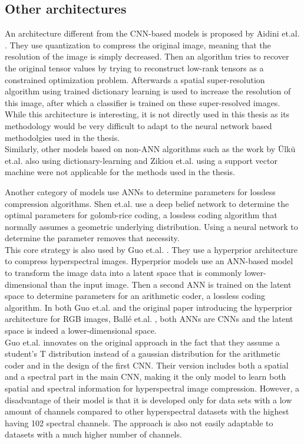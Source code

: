 \subsection{Other architectures}
An architecture different from the CNN-based models is proposed by Aidini et.al. \citep{aidini_hyperspectral_2019}. They use quantization to compress the original image, meaning that the resolution of the image is simply decreased. Then an algorithm tries to recover the original tensor values by trying to reconstruct low-rank tensors as a constrained optimization problem. Afterwards a spatial super-resolution algorithm using trained dictionary learning is used to increase the resolution of this image, after which a classifier is trained on these super-resolved images. While this architecture is interesting, it is not directly used in this thesis as its methodology would be very difficult to adapt to the neural network based methodolgies used in the thesis.\\
Similarly, other models based on non-ANN algorithms such as the work by Ülkü et.al. \citep{ulku_large-scale_2018} also using dictionary-learning and Zikiou et.al. \citep{zikiou_support_2020} using a support vector machine were not applicable for the methods used in the thesis.

Another category of models use ANNs to determine parameters for lossless compression algorithms. Shen et.al. \citep{shen_golomb-rice_2017} use a deep belief network to determine the optimal parameters for golomb-rice coding, a lossless coding algorithm that normally assumes a geometric underlying distribution. Using a neural network to determine the parameter removes that necessity.\\
This core strategy is also used by Guo et.al. \citep{guo_learned_2021}. They use a hyperprior architecture to compress hyperspectral images. Hyperprior models use an ANN-based model to transform the image data into a latent space that is commonly lower-dimensional than the input image. Then a second ANN is trained on the latent space to determine parameters for an arithmetic coder, a lossless coding algorithm. In both Guo et.al. and the original paper introducing the hyperprior architecture for RGB images, Ballé et.al. \citep{balle_end--end_2017}, both ANNs are CNNs and the latent space is indeed a lower-dimensional space.\\
Guo et.al. innovates on the original approach in the fact that they assume a student's T distribution instead of a gaussian distribution for the arithmetic coder and in the design of the first CNN. Their version includes both a spatial and a spectral part in the main CNN, making it the only model to learn both spatial and spectral information for hyperspectral image compression. However, a disadvantage of their model is that it is developed only for data sets with a low amount of channels compared to other hyperspectral datasets with the highest having 102 spectral channels. The approach is also not easily adaptable to datasets with a much higher number of channels.

